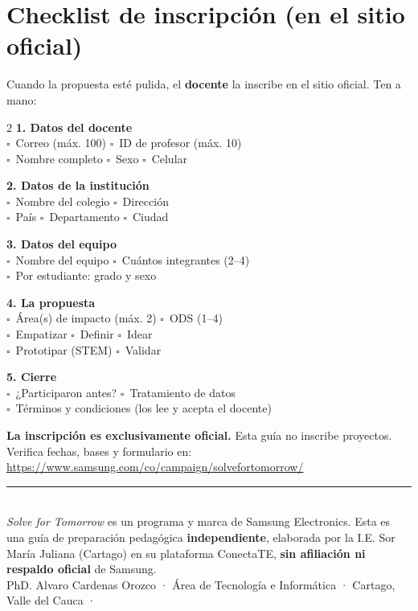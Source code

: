 \documentclass[11pt, letterpaper]{article}
\newcommand{\chk}{\textcolor{smjAzul}{$\square$}~}
\begin{document}
\section{Checklist de inscripción (en el sitio oficial)}

Cuando la propuesta esté pulida, el \textbf{docente} la inscribe en el sitio oficial. Ten a mano:

\begin{multicols}{2}
\textbf{\color{smjAzul}1. Datos del docente}\\
\chk Correo (máx. 100) \quad \chk ID de profesor (máx. 10)\\
\chk Nombre completo \quad \chk Sexo \quad \chk Celular

\smallskip
\textbf{\color{smjAzul}2. Datos de la institución}\\
\chk Nombre del colegio \quad \chk Dirección\\
\chk País \quad \chk Departamento \quad \chk Ciudad

\smallskip
\textbf{\color{smjAzul}3. Datos del equipo}\\
\chk Nombre del equipo \quad \chk Cuántos integrantes (2–4)\\
\chk Por estudiante: grado y sexo

\smallskip
\textbf{\color{smjAzul}4. La propuesta}\\
\chk Área(s) de impacto (máx. 2) \quad \chk ODS (1–4)\\
\chk Empatizar \quad \chk Definir \quad \chk Idear\\
\chk Prototipar (STEM) \quad \chk Validar

\smallskip
\textbf{\color{smjAzul}5. Cierre}\\
\chk ¿Participaron antes? \quad \chk Tratamiento de datos\\
\chk Términos y condiciones (los lee y acepta el docente)
\end{multicols}

\begin{oficial}
\textbf{La inscripción es exclusivamente oficial.} Esta guía no inscribe proyectos. Verifica fechas, bases y formulario en:\\
\url{https://www.samsung.com/co/campaign/solvefortomorrow/}
\end{oficial}

\vfill
\begin{center}
\footnotesize\color{gray}
\rule{0.4\linewidth}{0.4pt}\\[4pt]
\textit{Solve for Tomorrow} es un programa y marca de Samsung Electronics. Esta es una guía de preparación pedagógica \textbf{independiente}, elaborada por la I.E. Sor María Juliana (Cartago) en su plataforma ConectaTE, \textbf{sin afiliación ni respaldo oficial} de Samsung.\\[3pt]
PhD. Alvaro Cardenas Orozco \;·\; Área de Tecnología e Informática \;·\; Cartago, Valle del Cauca \;·
\end{center}
\end{document}
